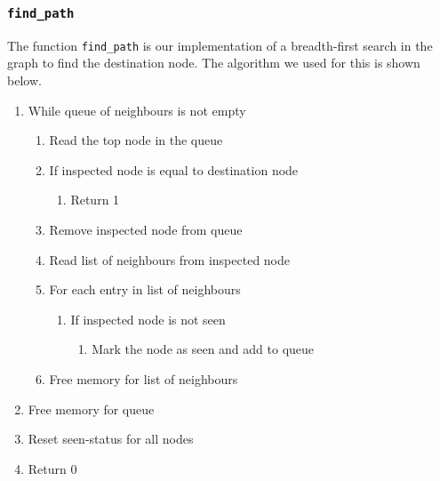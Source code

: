 \documentclass{article}
\begin{document}
\subsubsection{\texttt{find\_path}}
\label{sec:find_path}
The function \texttt{find\_path} is our implementation of a breadth-first search in the graph to find the destination node. The algorithm we used for this is shown below. 
\begin{enumerate}
    \item While queue of neighbours is not empty
    \begin{enumerate}
        \item Read the top node in the queue
        \item If inspected node is equal to destination node
        \begin{enumerate}
            \item Return 1
        \end{enumerate}
        \item Remove inspected node from queue
        \item Read list of neighbours from inspected node
        \item For each entry in list of neighbours
        \begin{enumerate}
            \item If inspected node is not seen
            \begin{enumerate}
                \item Mark the node as seen and add to queue
            \end{enumerate}
        \end{enumerate}
        \item Free memory for list of neighbours
    \end{enumerate}
    \item Free memory for queue
    \item Reset seen-status for all nodes
    \item Return 0
\end{enumerate}
\end{document}
